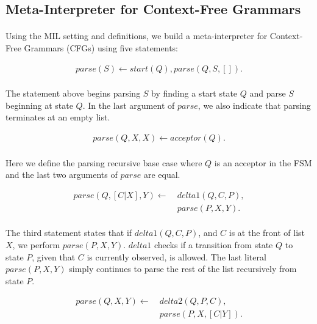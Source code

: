 \documentclass{article}
\theoremstyle{plain}
\theoremstyle{definition}
\begin{document}
\begin{multicols}{2}
\subsection{Meta-Interpreter for Context-Free Grammars}

\paragraph{} Using the MIL setting and definitions, we build a meta-interpreter for Context-Free Grammars (CFGs) using five statements:

\begin{align*}
parse(S) \leftarrow start(Q), parse(Q, S, []).
\end{align*}

\paragraph{} The statement above begins parsing $S$ by finding a start state $Q$ and parse $S$ beginning at state $Q$. In the last argument of $parse$, we also indicate that parsing terminates at an empty list.

\begin{align*}
parse(Q, X, X) \leftarrow acceptor(Q).
\end{align*}

\paragraph{} Here we define the parsing recursive base case where $Q$ is an acceptor in the FSM and the last two arguments of $parse$ are equal.

\begin{align*}
parse(Q, [C|X], Y) \leftarrow\ &delta1(Q, C, P),\\ &parse(P, X, Y).
\end{align*}

\paragraph{} The third statement states that if $delta1(Q, C, P)$, and $C$ is at the front of list $X$, we perform $parse(P, X, Y)$. $delta1$ checks if a transition from state $Q$ to state $P$, given that $C$ is currently observed, is allowed. The last literal $parse(P, X, Y)$ simply continues to parse the rest of the list recursively from state $P$.

\begin{align*}
parse(Q, X, Y) \leftarrow\ &delta2(Q, P, C),\\ &parse(P, X, [C|Y]).
\end{align*}


\end{multicols}
\end{document}
